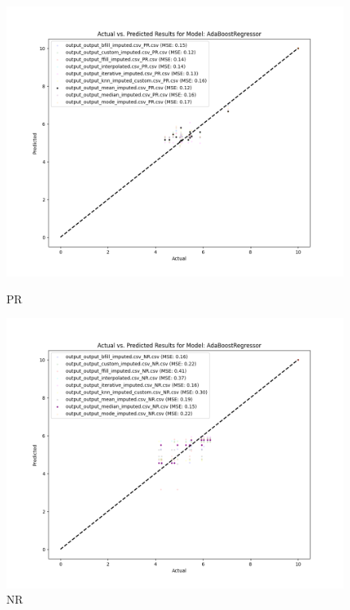 \begin{figure}[H]
    \centering
    \begin{minipage}{0.495\textwidth}
        \centering
        \includegraphics[width=\linewidth]{reg_section_all/images_reg_training/PR_AdaBoostRegressor_plot.png}
        \caption{PR}
        \label{fig:pr_reg_training}
    \end{minipage}\hfill
    \begin{minipage}{0.495\textwidth}
        \centering
        \includegraphics[width=\linewidth]{reg_section_all/images_reg_training/NR_AdaBoostRegressor_plot.png}
        \caption{NR}
        \label{fig:nr_reg_training}
    \end{minipage}
\end{figure}

